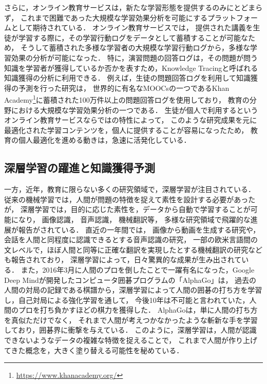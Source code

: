 さらに，オンライン教育サービスは，新たな学習形態を提供するのみにとどまらず，
これまで困難であった大規模な学習効果分析を可能にするプラットフォームとして期待されている．
オンライン教育サービスでは，
提供された講義を生徒が学習する際に，その学習行動ログをデータとして蓄積することが可能なため，
そうして蓄積された多様な学習者の大規模な学習行動ログから，多様な学習効果の分析が可能になった．
特に，演習問題の回答ログは，その問題が問う知識を学習者が獲得しているか否かを表すため，Knowledge Tracingと呼ばれる知識獲得の分析に利用できる\cite{corbett1994knowledge}．
例えば，生徒の問題回答ログを利用して知識獲得の予測を行った研究\cite{machardy2015toward}は，
世界的に有名なMOOCsの一つであるKhan Academy\footnote{\url{https://www.khanacademy.org/}}に蓄積された100万件以上の問題回答ログを使用しており，
教育の分野における大規模な学習効果分析の一つである．
生徒が個人で利用するというオンライン教育サービスならではの特性によって，
このような研究成果を元に最適化された学習コンテンツを，個人に提供することが容易になったため，
教育の個人最適化を進める動きは，急速に活発化している．


\subsection{深層学習の躍進と知識獲得予測}
一方，近年，教育に限らない多くの研究領域で，深層学習が注目されている．
従来の機械学習では，人間が問題の特徴を捉えて素性を設計する必要があったが，
深層学習では，目的に応じた素性を，データから自動で学習することが可能になり，
画像認識\cite{schroff2015facenet,szegedy2014going}，
音声認識\cite{hinton2012deep, bahdanau2015end}，
機械翻訳\cite{sutskever2014sequence, dong2015multi}等，
多様な研究領域で飛躍的な進展が報告がされている．
直近の一年間では，
画像から動画を生成する研究\cite{vondrick2016generating}や，
会話を人間と同程度に認識できるとする音声認識の研究\cite{xiong2016achieving}，
一部の欧米言語間の文レベルで，ほぼ人間と同等に正確な翻訳を実現したとする機械翻訳の研究\cite{wu2016google}なども報告されており，
深層学習によって，日々驚異的な成果が生み出されている．
また，2016年3月に人間のプロを倒したことで一躍有名になった，Google Deep Mindが開発したコンピュータ囲碁プログラムの「AlphaGo」\cite{silver2016mastering}は，
過去の人間の対局の記録である棋譜から，深層学習によって人間の囲碁の打ち方を学習し，自己対局による強化学習を通して，
今後10年は不可能と言われていた，人間のプロを打ち負かすほどの棋力を獲得した．
AlphaGoは，単に人間の打ち方を真似ただけでなく，
それまで人間が考えつかなかったような斬新な手を学習しており，囲碁界に衝撃を与えている．
このように，深層学習は，人間が認識できないようなデータの複雑な特徴を捉えることで，
これまで人間が作り上げてきた概念を，大きく塗り替える可能性を秘めている．


